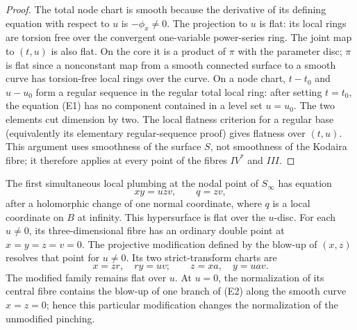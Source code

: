 \begin{proof}
The total node chart is smooth because the derivative of its defining
equation with respect to $u$ is $-\phi_x\ne0$. The projection to $u$
is flat: its local rings are torsion free over the convergent
one-variable power-series ring. The joint map to $(t,u)$ is also
flat. On the core it is a product of $\pi$ with the parameter disc;
$\pi$ is flat since a nonconstant map from a smooth connected surface
to a smooth curve has torsion-free local rings over the curve. On a
node chart, $t-t_0$ and $u-u_0$ form a regular sequence in the regular
total local ring: after setting $t=t_0$, the equation (E1) has no
component contained in a level set $u=u_0$. The two elements cut
dimension by two. The local flatness criterion for a regular base
(equivalently its elementary regular-sequence proof) gives flatness
over $(t,u)$. This argument uses smoothness of the surface $S$, not
smoothness of the Kodaira fibre; it therefore applies at every point
of the fibres $IV^*$ and $III$.
\end{proof}

\begin{proposition}\label{fam:src:E.1.3}\label{fam:st:E.1.3}
The first simultaneous local plumbing at the nodal point of $S_\infty$
has equation
\[
                 xy=u zv,\qquad q=zv,                         \tag{E2}
\]
after a holomorphic change of one normal coordinate, where $q$ is a
local coordinate on $B$ at infinity. This hypersurface is flat over
the $u$-disc. For each $u\ne0$, its three-dimensional fibre has an
ordinary double point at $x=y=z=v=0$. The projective modification
defined by the blow-up of $(x,z)$ resolves that point for $u\ne0$.
Its two strict-transform charts are
\[
       x=zr,\quad ry=uv;
       \qquad z=xa,\quad y=uav.                               \tag{E3}
\]
The modified family remains flat over $u$. At $u=0$, the normalization
of its central fibre contains the blow-up of one branch of (E2) along
the smooth curve $x=z=0$; hence this particular modification changes
the normalization of the unmodified pinching.
\end{proposition}

